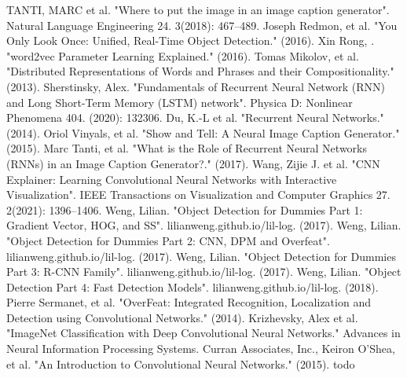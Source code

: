\begin{thebibliography}{}
 TANTI, MARC et al. "Where to put the image in an image caption generator". Natural Language Engineering 24. 3(2018): 467–489.
Joseph Redmon, et al. "You Only Look Once: Unified, Real-Time Object Detection." (2016).
Xin Rong, . "word2vec Parameter Learning Explained." (2016).
Tomas Mikolov, et al. "Distributed Representations of Words and Phrases and their Compositionality." (2013).
Sherstinsky, Alex. "Fundamentals of Recurrent Neural Network (RNN) and Long Short-Term Memory (LSTM) network". Physica D: Nonlinear Phenomena 404. (2020): 132306.
Du, K.-L et al. "Recurrent Neural Networks." (2014). 
Oriol Vinyals, et al. "Show and Tell: A Neural Image Caption Generator." (2015).
Marc Tanti, et al. "What is the Role of Recurrent Neural Networks (RNNs) in an Image Caption Generator?." (2017).
Wang, Zijie J. et al. "CNN Explainer: Learning Convolutional Neural Networks with Interactive Visualization". IEEE Transactions on Visualization and Computer Graphics 27. 2(2021): 1396–1406.
Weng, Lilian. "Object Detection for Dummies Part 1: Gradient Vector, HOG, and SS". lilianweng.github.io/lil-log. (2017).
Weng, Lilian. "Object Detection for Dummies Part 2: CNN, DPM and Overfeat". lilianweng.github.io/lil-log. (2017).
Weng, Lilian. "Object Detection for Dummies Part 3: R-CNN Family". lilianweng.github.io/lil-log. (2017).
Weng, Lilian. "Object Detection Part 4: Fast Detection Models". lilianweng.github.io/lil-log. (2018).
Pierre Sermanet, et al. "OverFeat: Integrated Recognition, Localization and Detection using Convolutional Networks." (2014).
Krizhevsky, Alex et al. "ImageNet Classification with Deep Convolutional Neural Networks." Advances in Neural Information Processing Systems. Curran Associates, Inc.,
Keiron O'Shea, et al. "An Introduction to Convolutional Neural Networks." (2015).
 todo
\end{thebibliography}
